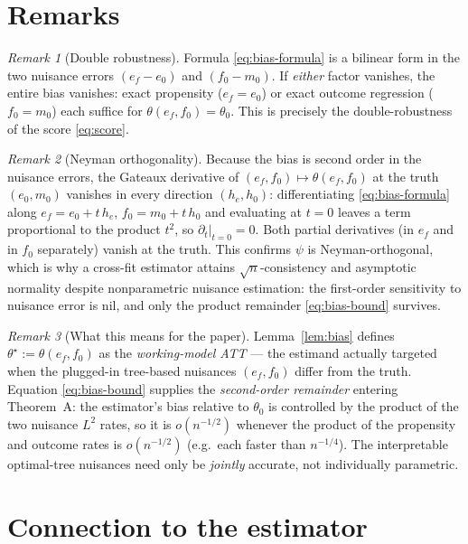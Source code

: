 \documentclass[11pt]{article}
\theoremstyle{plain}
\theoremstyle{remark}
\newtheorem*{remark}{Remark}
\newcommand{\ef}{e_f}
\newcommand{\ez}{e_0}
\newcommand{\mz}{m_0}
\newcommand{\fz}{f_0}
\begin{document}
\section{Remarks}

\begin{remark}[Double robustness]
Formula \eqref{eq:bias-formula} is a bilinear form in the two nuisance errors
$(\ef - \ez)$ and $(\fz - \mz)$. If \emph{either} factor vanishes, the entire
bias vanishes: exact propensity ($\ef = \ez$) or exact outcome regression
($\fz = \mz$) each suffice for $\theta(\ef, \fz) = \theta_0$. This is precisely
the double-robustness of the score \eqref{eq:score}.
\end{remark}

\begin{remark}[Neyman orthogonality]
Because the bias is second order in the nuisance errors, the Gateaux derivative
of $(\ef, \fz) \mapsto \theta(\ef, \fz)$ at the truth $(\ez, \mz)$ vanishes in
every direction $(h_e, h_0)$: differentiating \eqref{eq:bias-formula} along
$\ef = \ez + t\,h_e$, $\fz = \mz + t\,h_0$ and evaluating at $t = 0$ leaves a
term proportional to the product $t^2$, so $\partial_t|_{t=0} = 0$. Both partial
derivatives (in $\ef$ and in $\fz$ separately) vanish at the truth. This
confirms $\psi$ is Neyman-orthogonal, which is why a cross-fit estimator attains
$\sqrt{n}$-consistency and asymptotic normality despite nonparametric nuisance
estimation: the first-order sensitivity to nuisance error is nil, and only the
product remainder \eqref{eq:bias-bound} survives.
\end{remark}

\begin{remark}[What this means for the paper]
Lemma~\ref{lem:bias} defines $\theta^\star := \theta(\ef, \fz)$ as the
\emph{working-model ATT} --- the estimand actually targeted when the plugged-in
tree-based nuisances $(\ef, \fz)$ differ from the truth. Equation
\eqref{eq:bias-bound} supplies the \emph{second-order remainder} entering
Theorem~A: the estimator's bias relative to $\theta_0$ is controlled by the
product of the two nuisance $L^2$ rates, so it is $o(n^{-1/2})$ whenever the
product of the propensity and outcome rates is $o(n^{-1/2})$ (e.g.\ each faster
than $n^{-1/4}$). The interpretable optimal-tree nuisances need only be
\emph{jointly} accurate, not individually parametric.
\end{remark}

\section{Connection to the estimator}
\end{document}
